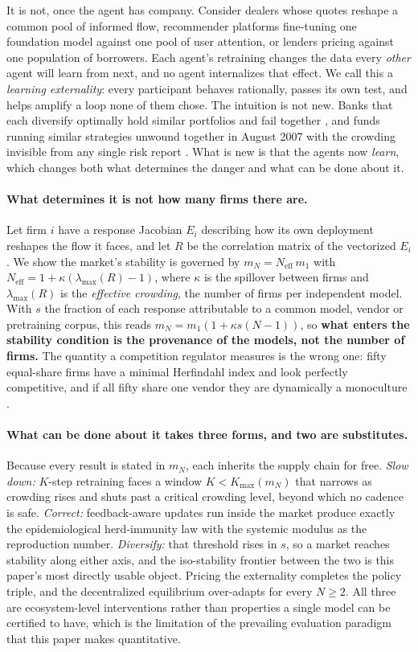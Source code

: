 \documentclass{article}
\theoremstyle{plain}
\theoremstyle{definition}
\newcommand{\Neff}{N_{\mathrm{eff}}}
\newcommand{\mN}{m_N}
\newcommand{\lmax}{\lambda_{\max}}
\begin{document}
It is not, once the agent has company. Consider dealers whose quotes reshape a common pool of informed flow, recommender platforms fine-tuning one foundation model against one pool of user attention, or lenders pricing against one population of borrowers. Each agent's retraining changes the data every \emph{other} agent will learn from next, and no agent internalizes that effect. We call this a \emph{learning externality}: every participant behaves rationally, passes its own test, and helps amplify a loop none of them chose. The intuition is not new. Banks that each diversify optimally hold similar portfolios and fail together \citep{beale2011,wagner2010}, and funds running similar strategies unwound together in August 2007 with the crowding invisible from any single risk report \citep{khandani2007}. What is new is that the agents now \emph{learn}, which changes both what determines the danger and what can be done about it.

\paragraph{What determines it is not how many firms there are.}
Let firm $i$ have a response Jacobian $E_i$ describing how its own deployment reshapes the flow it faces, and let $R$ be the correlation matrix of the vectorized $E_i$. We show the market's stability is governed by $\mN = \Neff\, m_1$ with $\Neff = 1 + \kappa(\lmax(R)-1)$, where $\kappa$ is the spillover between firms and $\lmax(R)$ is the \emph{effective crowding}, the number of firms per independent model. With $s$ the fraction of each response attributable to a common model, vendor or pretraining corpus, this reads $\mN = m_1(1 + \kappa s (N-1))$, so \textbf{what enters the stability condition is the provenance of the models, not the number of firms.} The quantity a competition regulator measures is the wrong one: fifty equal-share firms have a minimal Herfindahl index and look perfectly competitive, and if all fifty share one vendor they are dynamically a monoculture \citep{hirschman1964}.

\paragraph{What can be done about it takes three forms, and two are substitutes.}
Because every result is stated in $\mN$, each inherits the supply chain for free. \emph{Slow down:} $K$-step retraining faces a window $K < K_{\max}(\mN)$ that narrows as crowding rises and shuts past a critical crowding level, beyond which no cadence is safe. \emph{Correct:} feedback-aware updates \citep{izzo2021} run inside the market produce exactly the epidemiological herd-immunity law with the systemic modulus as the reproduction number. \emph{Diversify:} that threshold rises in $s$, so a market reaches stability along either axis, and the iso-stability frontier between the two is this paper's most directly usable object. Pricing the externality completes the policy triple, and the decentralized equilibrium over-adapts for every $N \geq 2$. All three are ecosystem-level interventions rather than properties a single model can be certified to have, which is the limitation of the prevailing evaluation paradigm that this paper makes quantitative.
\end{document}
